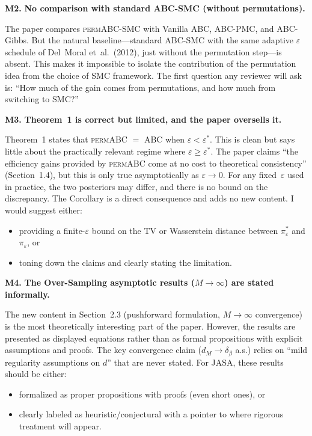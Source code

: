 \documentclass[11pt,a4paper]{article}
\newcommand{\major}[1]{\textbf{\color{red!70!black}M#1.}}
\begin{document}
\major{2} \textbf{No comparison with standard ABC-SMC (without permutations).}

The paper compares \textsc{permABC-SMC} with Vanilla ABC, ABC-PMC, and ABC-Gibbs. But the natural baseline---standard ABC-SMC with the same adaptive $\varepsilon$ schedule of Del~Moral et~al.\ (2012), just without the permutation step---is absent. This makes it impossible to isolate the contribution of the permutation idea from the choice of SMC framework. The first question any reviewer will ask is: ``How much of the gain comes from permutations, and how much from switching to SMC?''

\major{3} \textbf{Theorem~1 is correct but limited, and the paper oversells it.}

Theorem~1 states that \textsc{permABC} $=$ ABC when $\varepsilon < \varepsilon^*$. This is clean but says little about the practically relevant regime where $\varepsilon \geq \varepsilon^*$. The paper claims ``the efficiency gains provided by \textsc{permABC} come at no cost to theoretical consistency'' (Section~1.4), but this is only true asymptotically as $\varepsilon \to 0$. For any fixed~$\varepsilon$ used in practice, the two posteriors may differ, and there is no bound on the discrepancy. The Corollary is a direct consequence and adds no new content. I would suggest either:
\begin{itemize}[nosep]
    \item providing a finite-$\varepsilon$ bound on the TV or Wasserstein distance between $\pi^*_\varepsilon$ and $\pi_\varepsilon$, or
    \item toning down the claims and clearly stating the limitation.
\end{itemize}

\major{4} \textbf{The Over-Sampling asymptotic results ($M \to \infty$) are stated informally.}

The new content in Section~2.3 (pushforward formulation, $M \to \infty$ convergence) is the most theoretically interesting part of the paper. However, the results are presented as displayed equations rather than as formal propositions with explicit assumptions and proofs. The key convergence claim ($d_M \to \delta_\beta$ a.s.) relies on ``mild regularity assumptions on $d$'' that are never stated. For JASA, these results should be either:
\begin{itemize}[nosep]
    \item formalized as proper propositions with proofs (even short ones), or
    \item clearly labeled as heuristic/conjectural with a pointer to where rigorous treatment will appear.
\end{itemize}
\end{document}
